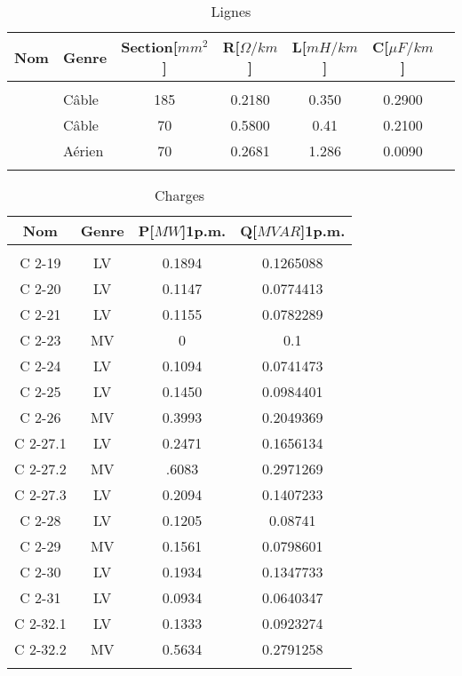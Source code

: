 \vspace{-.5cm}
\begin{table}[H]
	\captionsetup{justification=centering,margin=2cm}
	\caption{Lignes}
	\label{tab:Lignes}
	\centering
	\begin{tabular}{llccccc}
		\hline
		Nom&Genre&Section[$ mm^2 $]&R[$ \Omega/km $]&L[$ mH/km $]&C[$ \mu F/km $]\\
		\hline\\
		\cablei&Câble&185&0.2180&0.350&0.2900\\
		\cableii&Câble&70&0.5800&0.41&0.2100\\
		\cableiii&Aérien&70&0.2681&1.286&0.0090\\
		\hline\\
	\end{tabular}
\end{table}	
\pagebreak
\begin{table}[H]
	\captionsetup{justification=centering,margin=2cm}
	\caption{Charges}
	\label{tab:Charges}
	\centering
	\begin{tabular}{cccc}
		\hline
		Nom&Genre&P[$ MW $]1p.m.&Q[$MVAR$]1p.m.\\
		\hline\\
		C 2-19 &LV&0.1894&0.1265088\\
		C 2-20 &LV&0.1147&0.0774413\\
		C 2-21 &LV&0.1155&0.0782289\\
		C 2-23&MV&0&0.1\\
		C 2-24 &LV&0.1094&0.0741473\\
		C 2-25 &LV&0.1450&0.0984401\\
		C 2-26&MV&0.3993&0.2049369\\
		C 2-27.1&LV&0.2471&0.1656134\\
		C 2-27.2& MV&.6083&0.2971269\\
		C 2-27.3& LV&0.2094&0.1407233\\
		C 2-28 &LV&0.1205&0.08741\\
		C 2-29 &MV&0.1561&0.0798601\\
		C 2-30 &LV&0.1934&0.1347733\\
		C 2-31 &LV&0.0934&0.0640347\\
		C 2-32.1 &LV&0.1333&0.0923274\\
		C 2-32.2 &MV&0.5634&0.2791258\\
		\hline\\
	\end{tabular}
\end{table}	


